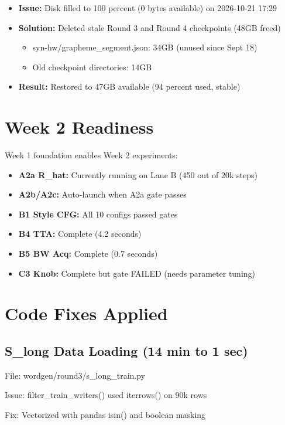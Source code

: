 \documentclass[12pt,a4paper]{article}
\begin{document}
\begin{itemize}
  \item \textbf{Issue:} Disk filled to 100 percent (0 bytes available) on 2026-10-21 17:29
  \item \textbf{Solution:} Deleted stale Round 3 and Round 4 checkpoints (48GB freed)
  \begin{itemize}
    \item syn-hw/grapheme\_segment.json: 34GB (unused since Sept 18)
    \item Old checkpoint directories: 14GB
  \end{itemize}
  \item \textbf{Result:} Restored to 47GB available (94 percent used, stable)
\end{itemize}

\section{Week 2 Readiness}

Week 1 foundation enables Week 2 experiments:

\begin{itemize}
  \item \textbf{A2a R\_hat:} Currently running on Lane B (450 out of 20k steps)
  \item \textbf{A2b/A2c:} Auto-launch when A2a gate passes
  \item \textbf{B1 Style CFG:} All 10 configs passed gates
  \item \textbf{B4 TTA:} Complete (4.2 seconds)
  \item \textbf{B5 BW Acq:} Complete (0.7 seconds)
  \item \textbf{C3 Knob:} Complete but gate FAILED (needs parameter tuning)
\end{itemize}

\section{Code Fixes Applied}

\subsection{S\_long Data Loading (14 min to 1 sec)}

File: wordgen/round3/s\_long\_train.py

Issue: filter\_train\_writers() used iterrows() on 90k rows

Fix: Vectorized with pandas isin() and boolean masking
\end{document}
